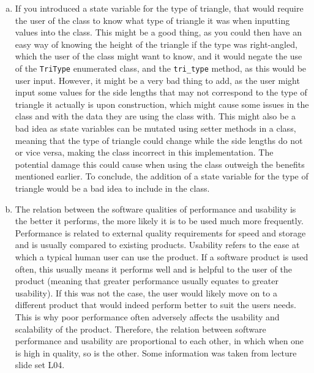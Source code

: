 \documentclass[12pt]{article}
\begin{document}
\begin{enumerate}[(a)]
\item If you introduced a state variable for the type of triangle, that would 
require the user of the class to know what type of triangle it was when inputting 
values into the class. This might be a good thing, as you could then have an 
easy way of knowing the height of the triangle if the type was right-angled, 
which the user of the class might want to know, and it would negate the use 
of the \verb|TriType| enumerated class, and the \verb|tri_type| method, as this 
would be user input. However, it might be a very bad thing to add, as the user 
might input some values for the side lengths that may not correspond to the type 
of triangle it actually is upon construction, which might cause some issues in 
the class and with the data they are using the class with. This might also be 
a bad idea as state variables can be mutated using setter methods in a class, 
meaning that the type of triangle could change while the side lengths do not 
or vice versa, making the class incorrect in this implementation. The potential 
damage this could cause when using the class outweigh the benefits mentioned 
earlier. To conclude, the addition of a state variable for the type of triangle 
would be a bad idea to include in the class.

\item The relation between the software qualities of performance and usability is 
the better it performs, the more likely it is to be used much more frequently. 
Performance is related to external quality requirements for speed and storage 
and is usually compared to existing products. Usability refers to the ease at 
which a typical human user can use the product. If a software product is used 
often, this usually means it performs well and is helpful to the user of the 
product (meaning that greater performance usually equates to greater usability). 
If this was not the case, the user would likely move on to a different product 
that would indeed perform better to suit the users needs. This is why poor 
performance often adversely affects the usability and scalability of the product. 
Therefore, the relation between software performance and usability are proportional 
to each other, in which when one is high in quality, so is the other. Some 
information was taken from lecture slide set L04. 


\end{enumerate}
\end{document}
